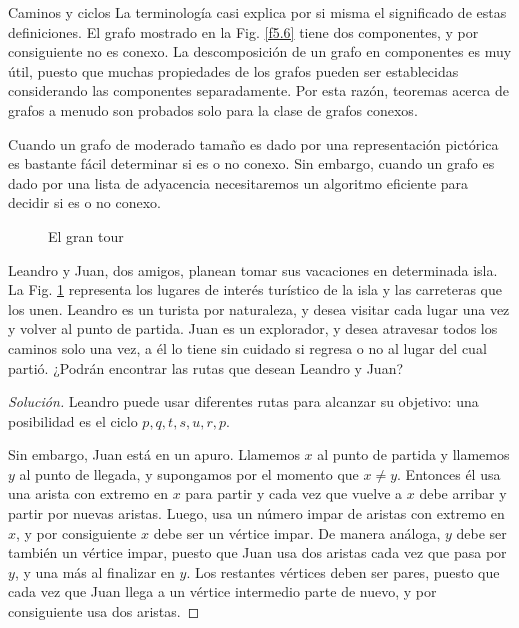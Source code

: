 \begin{section}{Caminos y ciclos}
La terminología casi explica por si misma el significado de estas definiciones. El grafo mostrado en la Fig. \ref{f5.6} tiene dos componentes, y por consiguiente no es conexo. La descomposición de un grafo en componentes es muy útil, puesto que muchas propiedades de los grafos pueden ser establecidas considerando las componentes separadamente. Por esta razón, teoremas acerca de grafos a menudo son probados solo para la clase de grafos conexos.

Cuando un grafo de moderado tamaño es dado por una representación pictórica es bastante fácil determinar si es o no conexo. Sin embargo, cuando un grafo es dado por una lista de adyacencia necesitaremos un algoritmo eficiente para decidir si es o no conexo. 

\begin{figure}[b]
    \begin{center}
    \end{center}
    \caption{El gran tour} \label{f5.7}
\end{figure}

\begin{ejemplo}\label{chunner} Leandro y Juan, dos amigos, planean tomar sus vacaciones en determinada isla. La Fig. \ref{f5.7} representa los lugares de interés turístico de la isla y las carreteras que los unen. Leandro es un turista por naturaleza, y desea visitar cada lugar una vez y volver al punto de partida. Juan es un explorador, y desea atravesar todos los caminos solo una vez, a él lo tiene sin cuidado si regresa o no al lugar del cual partió. ¿Podrán encontrar las rutas que desean Leandro y Juan?
\begin{proof}[Solución] Leandro puede usar diferentes rutas para alcanzar su objetivo: una posibilidad es el ciclo $p,q,t,s,u,r,p$.
    
    Sin embargo, Juan está en un apuro. Llamemos $x$ al punto de partida y llamemos $y$ al punto de llegada, y supongamos por el momento que $x \not= y$. Entonces él usa una arista con extremo en $x$ para partir y cada vez que vuelve a $x$ debe arribar y partir por nuevas aristas. Luego, usa un número impar de aristas con extremo en $x$, y por consiguiente $x$ debe ser un vértice impar. De manera análoga, $y$ debe ser también un vértice impar, puesto que Juan usa dos aristas cada vez que pasa por $y$, y una más al finalizar en $y$. Los restantes vértices deben ser pares, puesto que cada vez que Juan llega a un vértice intermedio parte de nuevo, y por consiguiente usa dos aristas.
    

\end{proof}
\end{ejemplo}
\end{section}
